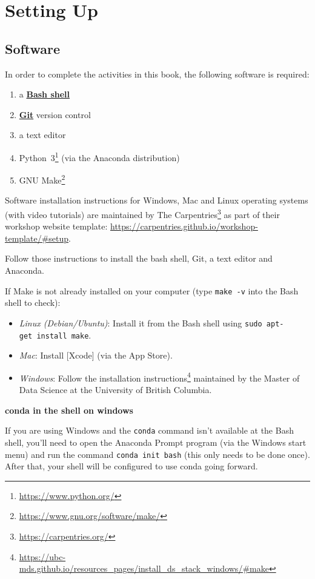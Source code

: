 \documentclass[
]{krantz}
\providecommand{\tightlist}{%
  \setlength{\itemsep}{0pt}\setlength{\parskip}{0pt}}
\renewenvironment{quote}{\begin{VF}}{\end{VF}}
\renewcommand{\href}[2]{#2\footnote{\url{#1}}}
\newcommand{\gref}[2]{\hyperlink{#2}{\textbf{#1}}}
\begin{document}
\hypertarget{install}{%
\chapter{Setting Up}\label{install}}

\hypertarget{install-software}{%
\section{Software}\label{install-software}}

In order to complete the activities in this book,
the following software is required:

\begin{enumerate}
\def\labelenumi{\arabic{enumi}.}
\tightlist
\item
  a \gref{Bash shell}{shell}
\item
  \gref{Git}{git} version control
\item
  a text editor
\item
  \href{https://www.python.org/}{Python~3} (via the Anaconda distribution)
\item
  \href{https://www.gnu.org/software/make/}{GNU Make}
\end{enumerate}

Software installation instructions for Windows, Mac and Linux operating systems
(with video tutorials) are maintained by \href{https://carpentries.org/}{The Carpentries}
as part of their workshop website template:
\url{https://carpentries.github.io/workshop-template/\#setup}.

Follow those instructions to install the bash shell, Git, a text editor and Anaconda.

If Make is not already installed on your computer (type \texttt{make\ -v} into the Bash shell to check):

\begin{itemize}
\tightlist
\item
  \emph{Linux (Debian/Ubuntu)}: Install it from the Bash shell using \texttt{sudo\ apt-get\ install\ make}.
\item
  \emph{Mac}: Install {[}Xcode{]} (via the App Store).
\item
  \emph{Windows}: Follow the \href{https://ubc-mds.github.io/resources_pages/install_ds_stack_windows/\#make}{installation instructions} maintained by the
  Master of Data Science at the University of British Columbia.
\end{itemize}

\begin{quote}
\textbf{conda in the shell on windows}

If you are using Windows and the \texttt{conda} command isn't available at the Bash shell,
you'll need to open the Anaconda Prompt program (via the Windows start menu)
and run the command \texttt{conda\ init\ bash} (this only needs to be done once).
After that, your shell will be configured to use conda going forward.
\end{quote}
\end{document}
